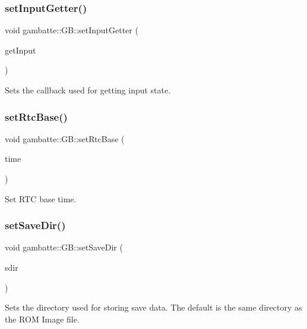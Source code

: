 \subsubsection{\texorpdfstring{set\+Input\+Getter()}{setInputGetter()}}
{\footnotesize\ttfamily void gambatte\+::\+G\+B\+::set\+Input\+Getter (\begin{DoxyParamCaption}\item[{\hyperlink{classgambatte_1_1InputGetter}{Input\+Getter} $\ast$}]{get\+Input }\end{DoxyParamCaption})}

Sets the callback used for getting input state. \mbox{\label{classgambatte_1_1GB_a6beebe28f631880573d8e6a91ceb675f}} 
\subsubsection{\texorpdfstring{set\+Rtc\+Base()}{setRtcBase()}}
{\footnotesize\ttfamily void gambatte\+::\+G\+B\+::set\+Rtc\+Base (\begin{DoxyParamCaption}\item[{time\+\_\+t}]{time }\end{DoxyParamCaption})}

Set R\+TC base time. \mbox{\label{classgambatte_1_1GB_ae5d14de04bb821ccdc2bc4d4dbc649c2}} 
\subsubsection{\texorpdfstring{set\+Save\+Dir()}{setSaveDir()}}
{\footnotesize\ttfamily void gambatte\+::\+G\+B\+::set\+Save\+Dir (\begin{DoxyParamCaption}\item[{std\+::string const \&}]{sdir }\end{DoxyParamCaption})}

Sets the directory used for storing save data. The default is the same directory as the R\+OM Image file. \mbox{\label{classgambatte_1_1GB_a2b1912a87c68f5483ed2272cafdd5648}} 
